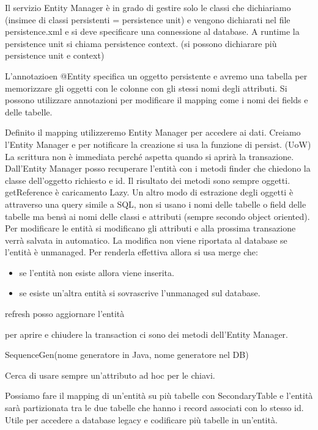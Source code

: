 Il servizio Entity Manager è in grado di gestire solo le classi che dichiariamo
(insimee di classi persistenti = persistence unit) e vengono dichiarati nel file
persistence.xml e si deve specificare una connessione al database. A runtime la
persistence unit si chiama persistence context. (si possono dichiarare più
persistence unit e context)

L'annotazioen @Entity specifica un oggetto persistente e avremo una tabella
per memorizzare gli oggetti con le colonne con gli stessi nomi degli attributi.
Si possono utilizzare annotazioni per modificare il mapping come i nomi dei fields
e delle tabelle.

Definito il mapping utilizzeremo Entity Manager per accedere ai dati. Creiamo
l'Entity Manager e per notificare la creazione si usa la funzione di persist.
(UoW) La scrittura non è immediata perché aspetta quando si aprirà la transazione.
Dall'Entity Manager posso recuperare l'entità con i metodi finder che chiedono la
classe dell'oggetto richiesto e id. Il risultato dei metodi sono sempre oggetti.
getReference è caricamento Lazy.
Un altro modo di estrazione degli oggetti è attraverso una query simile a SQL, non
si usano i nomi delle tabelle o field delle tabelle ma bensì ai nomi delle classi
e attributi (sempre secondo object oriented).
Per modificare le entità si modificano gli attributi e alla prossima transazione
verrà salvata in automatico. La modifica non viene riportata al database se l'entità
è unmanaged. Per renderla effettiva allora si usa merge che:
\begin{itemize}
      \item se l'entità non esiste allora viene inserita.
      \item se esiste un'altra entità si sovrascrive l'unmanaged sul database.
\end{itemize}

refresh posso aggiornare l'entità

per aprire e chiudere la transaction ci sono dei metodi dell'Entity Manager.

SequenceGen(nome generatore in Java, nome generatore nel DB)

Cerca di usare sempre un'attributo ad hoc per le chiavi.

Possiamo fare il mapping di un'entità su più tabelle con SecondaryTable e l'entità
sarà partizionata tra le due tabelle che hanno i record associati con lo stesso id.
Utile per accedere a database legacy e codificare più tabelle in un'entità.

